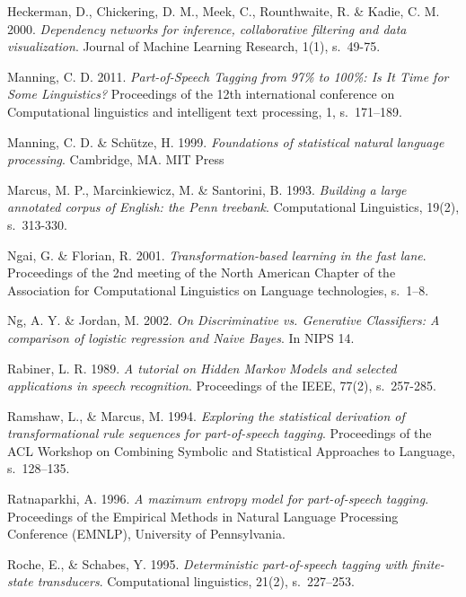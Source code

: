 \documentclass[utf8,bachelor,manualbib]{gradu3}
\begin{document}
\begin{thebibliography}{}
Heckerman, D., Chickering, D. M., Meek, C., Rounthwaite, R. \& Kadie, C. M. 2000. \textit{Dependency networks for inference, collaborative filtering and data visualization}.
Journal of Machine Learning Research, 1(1), s.~49-75.

Manning, C. D. 2011. \textit{Part-of-Speech Tagging from 97\% to 100\%: Is It Time for Some Linguistics?} Proceedings of the 12th international conference on Computational linguistics and intelligent text processing, 1, s.~171--189.

Manning, C. D. \& Sch\"{u}tze, H. 1999. \textit{Foundations of statistical natural language processing}.
Cambridge, MA. MIT Press

Marcus, M. P., Marcinkiewicz, M. \& Santorini, B. 1993. \textit{Building a large annotated corpus of English: the Penn treebank}. Computational Linguistics, 19(2), s.~313-330.

Ngai, G. \& Florian, R. 2001. \textit{Transformation-based learning in the fast lane}. Proceedings of the 2nd meeting of the North American Chapter of the Association for Computational Linguistics on Language technologies, s.~1--8.

Ng, A. Y. \& Jordan, M. 2002. \textit{On Discriminative vs. Generative Classifiers: A comparison of logistic regression and Naive Bayes}. In NIPS 14.

Rabiner, L. R. 1989. \textit{A tutorial on Hidden Markov Models and selected applications in speech recognition}. Proceedings of the IEEE, 77(2), s.~257-285.

Ramshaw, L., \& Marcus, M. 1994. \textit{Exploring the statistical derivation of transformational rule sequences for part-of-speech tagging}. Proceedings of the ACL Workshop on Combining Symbolic and Statistical Approaches to Language, s.~128--135.

Ratnaparkhi, A. 1996. \textit{A maximum entropy model for part-of-speech tagging}. Proceedings of the Empirical Methods in Natural Language Processing Conference (EMNLP), University of Pennsylvania.

Roche, E., \& Schabes, Y. 1995. \textit{Deterministic part-of-speech tagging with finite-state transducers}. Computational linguistics, 21(2), s.~227--253.


\end{thebibliography}
\end{document}
